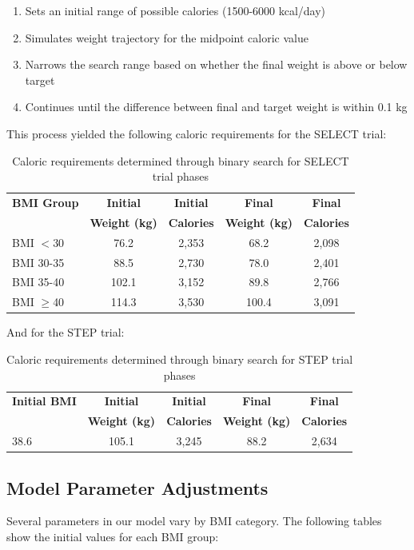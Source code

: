 \begin{enumerate}
    \item Sets an initial range of possible calories (1500-6000 kcal/day)
    \item Simulates weight trajectory for the midpoint caloric value
    \item Narrows the search range based on whether the final weight is above or below target
    \item Continues until the difference between final and target weight is within 0.1 kg
\end{enumerate}

This process yielded the following caloric requirements for the SELECT trial:

\begin{table}[h]
\centering
\begin{tabular}{|l|c|c|c|c|}
\hline
\textbf{BMI Group} & \textbf{Initial} & \textbf{Initial} & \textbf{Final} & \textbf{Final} \\
& \textbf{Weight (kg)} & \textbf{Calories} & \textbf{Weight (kg)} & \textbf{Calories} \\
\hline
BMI $<$30 & 76.2 & 2,353 & 68.2 & 2,098 \\
BMI 30-35 & 88.5 & 2,730 & 78.0 & 2,401 \\
BMI 35-40 & 102.1 & 3,152 & 89.8 & 2,766 \\
BMI $\geq$40 & 114.3 & 3,530 & 100.4 & 3,091 \\
\hline
\end{tabular}
\caption{Caloric requirements determined through binary search for SELECT trial phases}
\end{table}

And for the STEP trial:

\begin{table}[h]
\centering
\begin{tabular}{|l|c|c|c|c|}
\hline
\textbf{Initial BMI} & \textbf{Initial} & \textbf{Initial} & \textbf{Final} & \textbf{Final} \\
& \textbf{Weight (kg)} & \textbf{Calories} & \textbf{Weight (kg)} & \textbf{Calories} \\
\hline
38.6 & 105.1 & 3,245 & 88.2 & 2,634 \\
\hline
\end{tabular}
\caption{Caloric requirements determined through binary search for STEP trial phases}
\end{table}

\subsection{Model Parameter Adjustments}
Several parameters in our model vary by BMI category. The following tables show the initial values for each BMI group:

